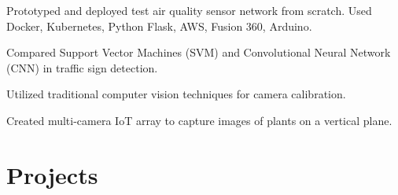 \documentclass[]{deedy-resume-openfont}
\begin{document}
\begin{minipage}[t]{0.70\textwidth}
\begin{tightemize}
\item Prototyped and deployed test air quality sensor network from scratch. Used Docker, Kubernetes, Python Flask, AWS, Fusion 360, Arduino.
\item Compared Support Vector Machines (SVM) and Convolutional Neural Network (CNN) in traffic sign detection.


\end{tightemize}
\sectionsep

\begin{tightemize}
\item Utilized traditional computer vision techniques for camera calibration.
\item Created multi-camera IoT array to capture images of plants on a vertical plane.
\end{tightemize}
\sectionsep






\section{Projects}





\end{minipage}
\end{document}
